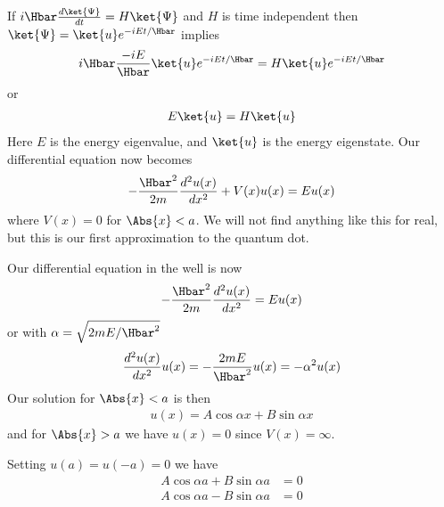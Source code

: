 {If \(i \Hbar \frac{d\ket{\Psi}}{dt} = H \ket{\Psi}\) and \(H\) is time independent then \(\ket{\Psi} = \ket{u} e^{-i E t/\Hbar}\) implies
%
\begin{equation}\label{eqn:lecture9boundStates:80}
\begin{aligned}
i \Hbar \frac{ -i E }{\Hbar} \ket{u} e^{-i E t/\Hbar} = H \ket{u} e^{-i E t/\Hbar}
\end{aligned}
\end{equation}
%
or
\begin{equation}\label{eqn:PHY356Lecture9:4}
\begin{aligned}
E \ket{u} = H \ket{u}
\end{aligned}
\end{equation}
%
Here \(E\) is the energy eigenvalue, and \(\ket{u}\) is the energy eigenstate.  Our differential equation now becomes
%
\begin{equation}\label{eqn:PHY356Lecture9:5}
\begin{aligned}
-\frac{\Hbar^2 }{2m} \frac{d^2 u(x)}{dx^2} + V(x) u(x) = E u(x)
\end{aligned}
\end{equation}
%
where \(V(x) = 0\) for \(\Abs{x} < a\).  We will not find anything like this for real, but this is our first approximation to the quantum dot.

Our differential equation in the well is now
%
\begin{equation}\label{eqn:PHY356Lecture9:6}
\begin{aligned}
-\frac{\Hbar^2 }{2m} \frac{d^2 u(x)}{dx^2} = E u(x)
\end{aligned}
\end{equation}
%
or with \(\alpha = \sqrt{2m E/\Hbar^2}\)
%
\begin{equation}\label{eqn:PHY356Lecture9:7}
\begin{aligned}
\frac{d^2 u(x)}{dx^2} u(x) = -\frac{2 m E}{\Hbar^2} u(x) = - \alpha^2 u(x)
\end{aligned}
\end{equation}
%
Our solution for \(\Abs{x} < a\) is then
%
\begin{equation}\label{eqn:PHY356Lecture9:8}
\begin{aligned}
u(x) = A \cos \alpha x + B \sin\alpha x
\end{aligned}
\end{equation}
%
and for \(\Abs{x} > a\) we have \(u(x) = 0\) since \(V(x) = \infty\).

Setting \(u(a) = u(-a) = 0\) we have
\begin{equation}\label{eqn:lecture9boundStates:100}
\begin{aligned}
A \cos \alpha a + B \sin\alpha a &= 0 \\
A \cos \alpha a - B \sin\alpha a &= 0
\end{aligned}
\end{equation}
%
%
}
